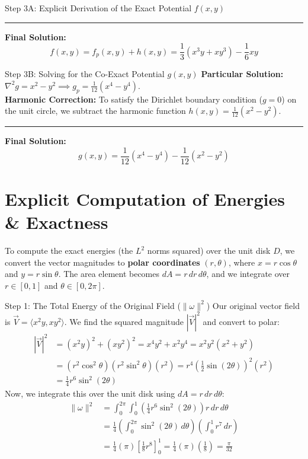 \documentclass[11pt]{article}
\begin{document}
\begin{stepbox}{Step 3A: Explicit Derivation of the Exact Potential $f(x,y)$}
\vspace{0.5em}
\hrule
\vspace{0.5em}
\textbf{Final Solution:} 
\[ f(x,y) = f_p(x,y) + h(x,y) = \frac{1}{3}(x^3y + xy^3) - \frac{1}{6}xy \]
\end{stepbox}

\begin{stepbox}{Step 3B: Solving for the Co-Exact Potential $g(x,y)$}
\textbf{Particular Solution:} $\nabla^2 g = x^2 - y^2 \implies g_p = \frac{1}{12}(x^4 - y^4)$. \\
\textbf{Harmonic Correction:} To satisfy the Dirichlet boundary condition ($g=0$) on the unit circle, we subtract the harmonic function $h(x,y) = \frac{1}{12}(x^2 - y^2)$. 

\vspace{0.5em}
\hrule
\vspace{0.5em}
\textbf{Final Solution:} 
\[ g(x,y) = \frac{1}{12}(x^4 - y^4) - \frac{1}{12}(x^2 - y^2) \]
\end{stepbox}

\section{Explicit Computation of Energies \& Exactness}
To compute the exact energies (the $L^2$ norms squared) over the unit disk $D$, we convert the vector magnitudes to \textbf{polar coordinates} $(r, \theta)$, where $x = r\cos\theta$ and $y = r\sin\theta$. The area element becomes $dA = r \, dr \, d\theta$, and we integrate over $r \in [0, 1]$ and $\theta \in [0, 2\pi]$.

\begin{stepbox}{Step 1: The Total Energy of the Original Field ($\|\omega\|^2$)}
Our original vector field is $\vec{V} = \langle x^2y, xy^2 \rangle$. We find the squared magnitude $|\vec{V}|^2$ and convert to polar:
\begin{align*}
|\vec{V}|^2 &= (x^2y)^2 + (xy^2)^2 = x^4y^2 + x^2y^4 = x^2y^2(x^2 + y^2) \\
&= (r^2\cos^2\theta)(r^2\sin^2\theta)(r^2) = r^4\left(\frac{1}{2}\sin(2\theta)\right)^2(r^2) \\
&= \frac{1}{4}r^6\sin^2(2\theta)
\end{align*}
Now, we integrate this over the unit disk using $dA = r \, dr \, d\theta$:
\begin{align*}
\|\omega\|^2 &= \int_0^{2\pi} \int_0^1 \left( \frac{1}{4}r^6\sin^2(2\theta) \right) r \, dr \, d\theta \\
&= \frac{1}{4} \left( \int_0^{2\pi} \sin^2(2\theta) \, d\theta \right) \left( \int_0^1 r^7 \, dr \right) \\
&= \frac{1}{4} (\pi) \left[ \frac{1}{8}r^8 \right]_0^1 = \frac{1}{4} (\pi) \left( \frac{1}{8} \right) = \frac{\pi}{32}
\end{align*}
\end{stepbox}
\end{document}
